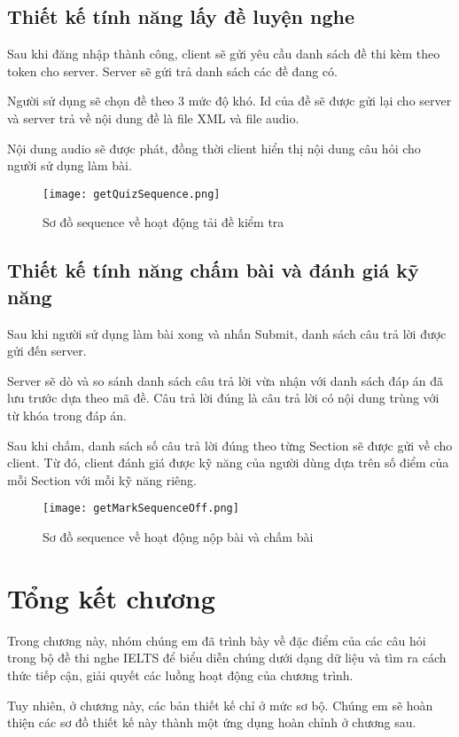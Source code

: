 \subsection{Thiết kế tính năng lấy đề luyện nghe}

Sau khi đăng nhập thành công, client sẽ gửi yêu cầu danh sách đề thi kèm theo token cho server. Server sẽ gửi trả danh sách các đề đang có.

Người sử dụng sẽ chọn đề theo 3 mức độ khó. Id của đề sẽ được gửi lại cho server và server trả về nội dung đề là file XML và file audio.

Nội dung audio sẽ được phát, đồng thời client hiển thị nội dung câu hỏi cho người sử dụng làm bài.

\begin{figure}[!htb] 
\centering
\texttt{[image: getQuizSequence.png]}
\caption{Sơ đồ sequence về hoạt động tải đề kiểm tra}
\end{figure}
\newpage

\subsection{Thiết kế tính năng chấm bài và đánh giá kỹ năng}

Sau khi người sử dụng làm bài xong và nhấn Submit, danh sách câu trả lời được gửi đến server.

Server sẽ dò và so sánh danh sách câu trả lời vừa nhận với danh sách đáp án đã lưu trước dựa theo mã đề. Câu trả lời đúng là câu trả lời có nội dung trùng với từ khóa trong đáp án.

Sau khi chấm, danh sách số câu trả lời đúng theo từng Section sẽ được gửi về cho client. Từ đó, client đánh giá được kỹ năng của người dùng dựa trên số điểm của mỗi Section với mỗi kỹ năng riêng.

\begin{figure}[!htb] 
\centering
\texttt{[image: getMarkSequenceOff.png]}
\caption{Sơ đồ sequence về hoạt động nộp bài và chấm bài}
\end{figure}
\newpage

\section{Tổng kết chương}

Trong chương này, nhóm chúng em đã trình bày về đặc điểm của các câu hỏi trong bộ đề thi nghe IELTS để biểu diễn chúng dưới dạng dữ liệu và tìm ra cách thức tiếp cận, giải quyết các luồng hoạt động của chương trình.

Tuy nhiên, ở chương này, các bản thiết kế chỉ ở mức sơ bộ. Chúng em sẽ hoàn thiện các sơ đồ thiết kế này thành một ứng dụng hoàn chỉnh ở chương sau.
